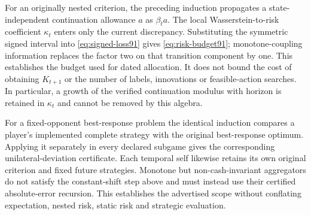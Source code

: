 For an originally nested criterion, the preceding induction propagates a state-independent continuation allowance $a$ as $\beta_t a$. The local Wasserstein-to-risk coefficient $\kappa_t$ enters only the current discrepancy. Substituting the symmetric signed interval into \eqref{eq:signed-loss91} gives \eqref{eq:risk-budget91}; monotone-coupling information replaces the factor two on that transition component by one. This establishes the budget used for dated allocation. It does not bound the cost of obtaining $K_{t+1}$ or the number of labels, innovations or feasible-action searches. In particular, a growth of the verified continuation modulus with horizon is retained in $\kappa_t$ and cannot be removed by this algebra.

For a fixed-opponent best-response problem the identical induction compares a player's implemented complete strategy with the original best-response optimum. Applying it separately in every declared subgame gives the corresponding unilateral-deviation certificate. Each temporal self likewise retains its own original criterion and fixed future strategies. Monotone but non-cash-invariant aggregators do not satisfy the constant-shift step above and must instead use their certified absolute-error recursion. This establishes the advertised scope without conflating expectation, nested risk, static risk and strategic evaluation.
